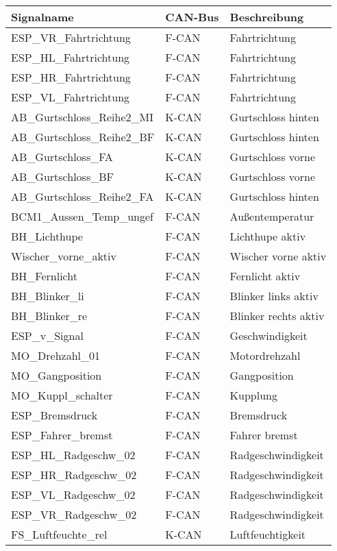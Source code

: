 \begin{longtable}{@{\extracolsep{\fill}}|l|l|l|@{}}
    \hline
    Signalname & CAN-Bus & Beschreibung \\
    \hline
    ESP\_VR\_Fahrtrichtung & F-CAN & Fahrtrichtung \\
    ESP\_HL\_Fahrtrichtung & F-CAN & Fahrtrichtung \\
    ESP\_HR\_Fahrtrichtung & F-CAN & Fahrtrichtung \\
    ESP\_VL\_Fahrtrichtung & F-CAN & Fahrtrichtung \\
    AB\_Gurtschloss\_Reihe2\_MI & K-CAN & Gurtschloss hinten \\
    AB\_Gurtschloss\_Reihe2\_BF & K-CAN & Gurtschloss hinten \\
    AB\_Gurtschloss\_FA & K-CAN & Gurtschloss vorne \\
    AB\_Gurtschloss\_BF & K-CAN & Gurtschloss vorne \\
    AB\_Gurtschloss\_Reihe2\_FA & K-CAN & Gurtschloss hinten \\
    BCM1\_Aussen\_Temp\_ungef & F-CAN & Außentemperatur \\
    BH\_Lichthupe & F-CAN & Lichthupe aktiv \\
    Wischer\_vorne\_aktiv & F-CAN & Wischer vorne aktiv \\
    BH\_Fernlicht & F-CAN & Fernlicht aktiv \\
    BH\_Blinker\_li & F-CAN & Blinker links aktiv \\
    BH\_Blinker\_re & F-CAN & Blinker rechts aktiv \\
    ESP\_v\_Signal & F-CAN & Geschwindigkeit \\
    MO\_Drehzahl\_01 & F-CAN & Motordrehzahl \\
    MO\_Gangposition & F-CAN & Gangposition \\
    MO\_Kuppl\_schalter & F-CAN & Kupplung \\
    ESP\_Bremsdruck & F-CAN & Bremsdruck \\
    ESP\_Fahrer\_bremst & F-CAN & Fahrer bremst \\
    ESP\_HL\_Radgeschw\_02 & F-CAN & Radgeschwindigkeit \\
    ESP\_HR\_Radgeschw\_02 & F-CAN & Radgeschwindigkeit \\
    ESP\_VL\_Radgeschw\_02 & F-CAN & Radgeschwindigkeit \\
    ESP\_VR\_Radgeschw\_02 & F-CAN & Radgeschwindigkeit \\
    FS\_Luftfeuchte\_rel & K-CAN & Luftfeuchtigkeit \\

\end{longtable}
